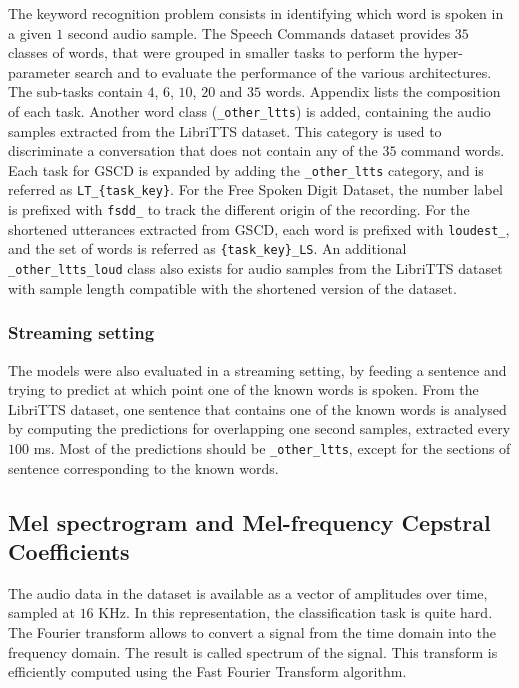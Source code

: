 The keyword recognition problem consists in identifying which word is spoken in
a given $1$ second audio sample.
The Speech Commands dataset provides $35$ classes of words, that were grouped
in smaller tasks to perform the hyper-parameter search and to evaluate the
performance of the various architectures.
The sub-tasks contain $4$, $6$, $10$, $20$ and $35$ words.
Appendix  lists the composition of each
task.
Another word class (\texttt{\_other\_ltts}) is added, containing the audio
samples extracted from the LibriTTS dataset.
This category is used to discriminate a conversation that does not contain any
of the $35$ command words.
Each task for GSCD is expanded by adding the \texttt{\_other\_ltts} category,
and is referred as \texttt{LT\_\{task\_key\}}.
For the Free Spoken Digit Dataset, the number label is prefixed with
\texttt{fsdd\_} to track the different origin of the recording.
For the shortened utterances extracted from GSCD, each word is prefixed with
\texttt{loudest\_}, and
the set of words is referred as
\texttt{\{task\_key\}\_LS}.
An additional \texttt{\_other\_ltts\_loud} class also exists for audio samples
from the LibriTTS dataset with sample length compatible with the shortened
version of the dataset.

\subsubsection{Streaming setting}

The models were also evaluated in a streaming setting, by feeding
a sentence and trying to predict at which point one of the known words is spoken.
From the LibriTTS dataset, one sentence that contains one of the known words is
analysed by computing the predictions for overlapping one second samples,
extracted every $100$ ms.
Most of the predictions should be \texttt{\_other\_ltts}, except for
the sections of sentence corresponding to the known words.

\subsection{Mel spectrogram and Mel-frequency Cepstral Coefficients}

The audio data in the dataset is available as a vector of amplitudes over time,
sampled at $16$ KHz. In this representation, the classification task is quite
hard.
The Fourier transform allows to convert a signal from the time domain into the
frequency domain. The result is called spectrum of the signal. This transform
is efficiently computed using the Fast Fourier Transform algorithm.

